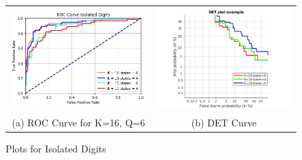 \begin{figure}[h!]
	\hspace*{0cm}\begin{tabular}{cc}
		\includegraphics[width=70mm]{HMM/roc_isolated_digit_multiple_Ks.png} & \includegraphics[width=70mm]{HMM/nit_digit_dtw.jpg} \\
		(a) ROC Curve for K=16, Q=6 & (b) DET Curve\\[4pt]
		
	\end{tabular}\hspace*{0cm}
	\caption{Plots for Isolated Digits }
\end{figure}